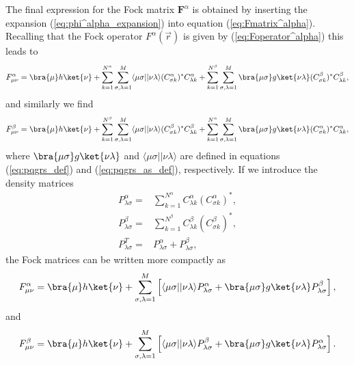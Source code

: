The final expression for the Fock matrix $\mathbf F^\alpha$ is obtained by inserting the expansion (\ref{eq:phi^alpha_expansion}) into equation (\ref{eq:Fmatrix^alpha}).
Recalling that the Fock operator $F^\alpha(\vec r)$ is given by (\ref{eq:Foperator^alpha}) this leads to
\begin{equation}
 F^\alpha_{\mu\nu} = \bra{\mu}h\ket{\nu} + \sum_{k=1}^{N^\alpha}\sum_{\sigma,\lambda=1}^M\langle\mu\sigma||\nu\lambda\rangle(C^\alpha_{\sigma k})^* C^\alpha_{\lambda k}
                                         + \sum_{k=1}^{N^\beta}\sum_{\sigma,\lambda=1}^M\bra{\mu\sigma}g\ket{\nu\lambda}(C^\beta_{\sigma k})^* C^\beta_{\lambda k},
\end{equation}
and similarly we find
\begin{equation}
 F^\beta_{\mu\nu} = \bra{\mu}h\ket{\nu} + \sum_{k=1}^{N^\beta}\sum_{\sigma,\lambda=1}^M\langle\mu\sigma||\nu\lambda\rangle(C^\beta_{\sigma k})^* C^\beta_{\lambda k}
                                         + \sum_{k=1}^{N^\alpha}\sum_{\sigma,\lambda=1}^M\bra{\mu\sigma}g\ket{\nu\lambda}(C^\alpha_{\sigma k})^* C^\alpha_{\lambda k},
\end{equation}
where $\bra{\mu\sigma}g\ket{\nu\lambda}$ and $\langle\mu\sigma||\nu\lambda\rangle$ are defined in equations (\ref{eq:pqgrs_def}) and (\ref{eq:pqgrs_as_def}),
respectively. If we introduce the density matrices
\begin{align}
  P^\alpha_{\lambda\sigma} = & \sum_{k=1}^{N^\alpha}C^\alpha_{\lambda k} (C^\alpha_{\sigma k})^*, \label{eq:density_matrix_up}\\
  P^\beta_{\lambda\sigma} = & \sum_{k=1}^{N^\beta}C^\beta_{\lambda k} (C^\beta_{\sigma k})^*, \label{eq:density_matrix_down}\\
  P^T_{\lambda\sigma} = & P^\alpha_{\lambda\sigma} + P^\beta_{\lambda\sigma},
\end{align}
the Fock matrices can be written more compactly as
\begin{equation}
\label{eq:Fock_matrix_up}
 F^\alpha_{\mu\nu} = \bra{\mu}h\ket{\nu} + \sum_{\sigma,\lambda=1}^M\left[\langle\mu\sigma||\nu\lambda\rangle P^\alpha_{\lambda\sigma}
                                                                      + \bra{\mu\sigma}g\ket{\nu\lambda}P^\beta_{\lambda\sigma}\right],
\end{equation}
and
\begin{equation}
\label{eq:Fock_matrix_down}
 F^\beta_{\mu\nu} = \bra{\mu}h\ket{\nu} + \sum_{\sigma,\lambda=1}^M\left[\langle\mu\sigma||\nu\lambda\rangle P^\beta_{\lambda\sigma}
                                                                  + \bra{\mu\sigma}g\ket{\nu\lambda}P^\alpha_{\lambda\sigma}\right].
\end{equation}


